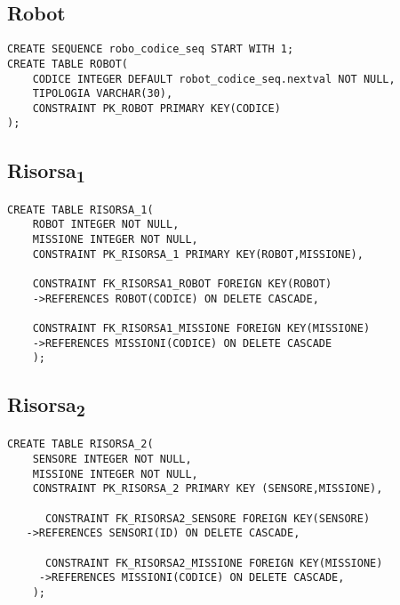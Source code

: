 \begin{description}
\subsection{Robot}
\begin{verbatim}
CREATE SEQUENCE robo_codice_seq START WITH 1;
CREATE TABLE ROBOT(
    CODICE INTEGER DEFAULT robot_codice_seq.nextval NOT NULL,
    TIPOLOGIA VARCHAR(30),
    CONSTRAINT PK_ROBOT PRIMARY KEY(CODICE)
);
\end{verbatim}

\subsection{Risorsa\textsubscript{1}}
\begin{verbatim}
CREATE TABLE RISORSA_1(
    ROBOT INTEGER NOT NULL,
    MISSIONE INTEGER NOT NULL,
    CONSTRAINT PK_RISORSA_1 PRIMARY KEY(ROBOT,MISSIONE),

    CONSTRAINT FK_RISORSA1_ROBOT FOREIGN KEY(ROBOT)
    ->REFERENCES ROBOT(CODICE) ON DELETE CASCADE,
    
    CONSTRAINT FK_RISORSA1_MISSIONE FOREIGN KEY(MISSIONE) 
    ->REFERENCES MISSIONI(CODICE) ON DELETE CASCADE
    );
\end{verbatim}

\subsection{Risorsa\textsubscript{2}}
\begin{verbatim}
CREATE TABLE RISORSA_2(
    SENSORE INTEGER NOT NULL,
    MISSIONE INTEGER NOT NULL,
    CONSTRAINT PK_RISORSA_2 PRIMARY KEY (SENSORE,MISSIONE),
     
      CONSTRAINT FK_RISORSA2_SENSORE FOREIGN KEY(SENSORE)
   ->REFERENCES SENSORI(ID) ON DELETE CASCADE,

      CONSTRAINT FK_RISORSA2_MISSIONE FOREIGN KEY(MISSIONE)
     ->REFERENCES MISSIONI(CODICE) ON DELETE CASCADE,
    );
\end{verbatim}
\end{description}


